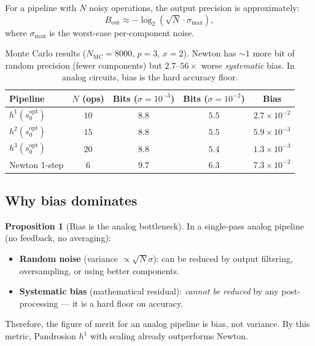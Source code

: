 \documentclass[11pt,a4paper]{article}
\theoremstyle{definition}
\newtheorem{proposition}{Proposition}[section]
\begin{document}
For a pipeline with $N$ noisy operations, the output precision is approximately:
\begin{equation}
  B_{\text{out}} \approx -\log_2\!\left(\sqrt{N} \cdot \sigma_{\max}\right),
\end{equation}
where $\sigma_{\max}$ is the worst-case per-component noise.

\begin{table}[H]
\centering
\begin{tabular}{lcccc}
\toprule
\textbf{Pipeline} & $N$ \textbf{(ops)} & \textbf{Bits} ($\sigma = 10^{-3}$) & \textbf{Bits} ($\sigma = 10^{-2}$) & \textbf{Bias} \\
\midrule
$h^1(s_0^{\mathrm{opt}})$ & $10$ & $8.8$ & $5.5$ & $2.7 \times 10^{-2}$ \\
$h^2(s_0^{\mathrm{opt}})$ & $15$ & $8.8$ & $5.5$ & $5.9 \times 10^{-3}$ \\
$h^3(s_0^{\mathrm{opt}})$ & $20$ & $8.8$ & $5.4$ & $1.3 \times 10^{-3}$ \\
\midrule
Newton 1-step & $6$ & $9.7$ & $6.3$ & $7.3 \times 10^{-2}$ \\
\bottomrule
\end{tabular}
\caption{Monte Carlo results ($N_{\text{MC}} = 8000$, $p = 3$, $x = 2$).  Newton has $\sim 1$ more bit of random precision (fewer components) but $2.7$--$56\times$ worse \emph{systematic} bias.  In analog circuits, bias is the hard accuracy floor.}
\label{tab:mc_results}
\end{table}

\subsection{Why bias dominates}

\begin{proposition}[Bias is the analog bottleneck]
\label{prop:bias_bottleneck}
In a single-pass analog pipeline (no feedback, no averaging):
\begin{itemize}
  \item \textbf{Random noise} (variance $\propto \sqrt{N}\sigma$): can be reduced by output filtering, oversampling, or using better components.
  \item \textbf{Systematic bias} (mathematical residual): \emph{cannot be reduced} by any post-processing --- it is a hard floor on accuracy.
\end{itemize}
Therefore, the figure of merit for an analog pipeline is bias, not variance.  By this metric, Pandrosion $h^1$ with scaling already outperforms Newton.
\end{proposition}
\end{document}
